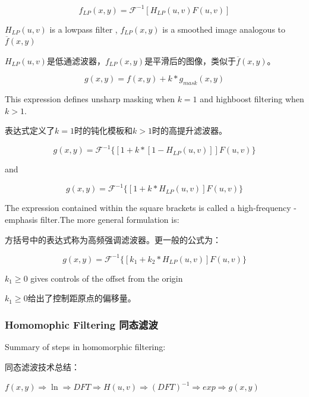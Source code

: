 \documentclass[12pt]{article}
\numberwithin{equation}{section}%
\begin{document}
\begin{equation} \label{4.56}
f_{LP}(x,y)=\mathscr{F}^{-1}[H_{LP}(u,v)F(u,v)]
\end{equation} 

$H_{LP}(u,v)$ is a lowpass filter , $f_{LP}(x,y)$ is a smoothed image analogous to $\overline{f}(x,y)$ 

$H_{LP}(u,v)$是低通滤波器，$f_{LP}(x,y)$是平滑后的图像，类似于$\overline{f}(x,y)$。

\begin{equation} \label{4.57}
g(x,y)=f(x,y)+k*g_{mask}(x,y)
\end{equation} 

This expression defines unsharp masking when $k=1$ and highboost filtering when $k>1$.

表达式定义了$k=1$时的钝化模板和$k>1$时的高提升滤波器。

\begin{equation} \label{4.58}
g(x,y)=\mathscr{F}^{-1}\{[1+k*[1-H_{LP}(u,v)]]F(u,v)\}
\end{equation} 

and 

\begin{equation} \label{4.59}
g(x,y)=\mathscr{F}^{-1}\{[1+k*H_{LP}(u,v)]F(u,v)\}
\end{equation} 

The expression contained within the square brackets is called a high-frequency -emphasis filter.The more general formulation is:

方括号中的表达式称为高频强调滤波器。更一般的公式为：

\begin{equation} \label{4.60}
g(x,y)=\mathscr{F}^{-1}\{[k_{1}+k_{2}*H_{LP}(u,v)]F(u,v)\}
\end{equation}

$k_{1}\geq 0$ gives controls of the offset from the origin

$k_{1}\geq 0$给出了控制距原点的偏移量。

\subsubsection{Homomophic Filtering 同态滤波}

Summary of steps in homomorphic filtering:

同态滤波技术总结：

$f(x,y)\Rightarrow \ln\Rightarrow DFT\Rightarrow H(u,v)\Rightarrow (DFT)^{-1}\Rightarrow exp\Rightarrow g(x,y)$
\end{document}
